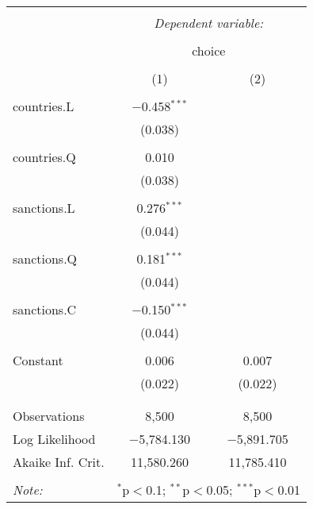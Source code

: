 
\begin{table}[!htbp] \centering 
  \caption{} 
  \label{tab:glm:null} 
\begin{tabular}{@{\extracolsep{5pt}}lcc} 
\\[-1.8ex]\hline 
\hline \\[-1.8ex] 
 & \multicolumn{2}{c}{\textit{Dependent variable:}} \\ 
\cline{2-3} 
\\[-1.8ex] & \multicolumn{2}{c}{choice} \\ 
\\[-1.8ex] & (1) & (2)\\ 
\hline \\[-1.8ex] 
 countries.L & $-$0.458$^{***}$ &  \\ 
  & (0.038) &  \\ 
  & & \\ 
 countries.Q & 0.010 &  \\ 
  & (0.038) &  \\ 
  & & \\ 
 sanctions.L & 0.276$^{***}$ &  \\ 
  & (0.044) &  \\ 
  & & \\ 
 sanctions.Q & 0.181$^{***}$ &  \\ 
  & (0.044) &  \\ 
  & & \\ 
 sanctions.C & $-$0.150$^{***}$ &  \\ 
  & (0.044) &  \\ 
  & & \\ 
 Constant & 0.006 & 0.007 \\ 
  & (0.022) & (0.022) \\ 
  & & \\ 
\hline \\[-1.8ex] 
Observations & 8,500 & 8,500 \\ 
Log Likelihood & $-$5,784.130 & $-$5,891.705 \\ 
Akaike Inf. Crit. & 11,580.260 & 11,785.410 \\ 
\hline 
\hline \\[-1.8ex] 
\textit{Note:}  & \multicolumn{2}{r}{$^{*}$p$<$0.1; $^{**}$p$<$0.05; $^{***}$p$<$0.01} \\ 
\end{tabular} 
\end{table}  
